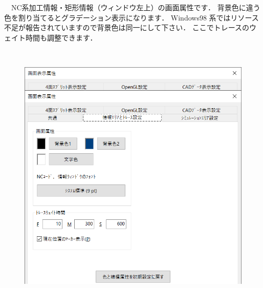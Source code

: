 \begin{minipage}[t]{0.38\textwidth}
　NC系加工情報・矩形情報（ウィンドウ左上）の画面属性です．
背景色に違う色を割り当てるとグラデーション表示になります．
Windows98 系ではリソース不足が報告されていますので背景色は同一にして下さい．
ここでトレースのウェイト時間も調整できます．
\end{minipage}
\begin{minipage}[t]{0.02\textwidth}
　
\end{minipage}
\begin{minipage}[t]{0.6\textwidth}
\vspace*{-2zh}
\begin{figure}[H]
\centering
\includegraphics[width=\textwidth]{No6/fig/disp2.png}
\label{fig:disp2.png}
\end{figure}
\end{minipage}

